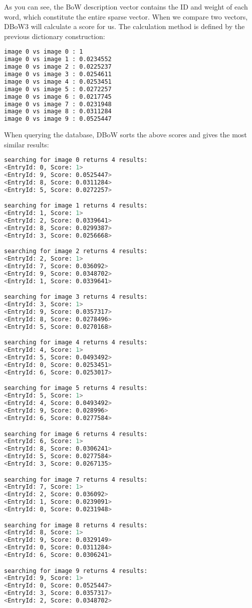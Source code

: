 As you can see, the BoW description vector contains the ID and weight of each word, which constitute the entire sparse vector. When we compare two vectors, DBoW3 will calculate a score for us. The calculation method is defined by the previous dictionary construction:

\begin{lstlisting}[language=sh,caption=Terminal output:]
image 0 vs image 0 : 1
image 0 vs image 1 : 0.0234552
image 0 vs image 2 : 0.0225237
image 0 vs image 3 : 0.0254611
image 0 vs image 4 : 0.0253451
image 0 vs image 5 : 0.0272257
image 0 vs image 6 : 0.0217745
image 0 vs image 7 : 0.0231948
image 0 vs image 8 : 0.0311284
image 0 vs image 9 : 0.0525447
\end{lstlisting}

When querying the database, DBoW sorts the above scores and gives the most similar results:
\begin{lstlisting}[language=sh,caption=Terminal output:]
searching for image 0 returns 4 results:
<EntryId: 0, Score: 1>
<EntryId: 9, Score: 0.0525447>
<EntryId: 8, Score: 0.0311284>
<EntryId: 5, Score: 0.0272257>

searching for image 1 returns 4 results:
<EntryId: 1, Score: 1>
<EntryId: 2, Score: 0.0339641>
<EntryId: 8, Score: 0.0299387>
<EntryId: 3, Score: 0.0256668>

searching for image 2 returns 4 results:
<EntryId: 2, Score: 1>
<EntryId: 7, Score: 0.036092>
<EntryId: 9, Score: 0.0348702>
<EntryId: 1, Score: 0.0339641>

searching for image 3 returns 4 results:
<EntryId: 3, Score: 1>
<EntryId: 9, Score: 0.0357317>
<EntryId: 8, Score: 0.0278496>
<EntryId: 5, Score: 0.0270168>

searching for image 4 returns 4 results:
<EntryId: 4, Score: 1>
<EntryId: 5, Score: 0.0493492>
<EntryId: 0, Score: 0.0253451>
<EntryId: 6, Score: 0.0253017>

searching for image 5 returns 4 results:
<EntryId: 5, Score: 1>
<EntryId: 4, Score: 0.0493492>
<EntryId: 9, Score: 0.028996>
<EntryId: 6, Score: 0.0277584>

searching for image 6 returns 4 results:
<EntryId: 6, Score: 1>
<EntryId: 8, Score: 0.0306241>
<EntryId: 5, Score: 0.0277584>
<EntryId: 3, Score: 0.0267135>

searching for image 7 returns 4 results:
<EntryId: 7, Score: 1>
<EntryId: 2, Score: 0.036092>
<EntryId: 1, Score: 0.0239091>
<EntryId: 0, Score: 0.0231948>

searching for image 8 returns 4 results:
<EntryId: 8, Score: 1>
<EntryId: 9, Score: 0.0329149>
<EntryId: 0, Score: 0.0311284>
<EntryId: 6, Score: 0.0306241>

searching for image 9 returns 4 results:
<EntryId: 9, Score: 1>
<EntryId: 0, Score: 0.0525447>
<EntryId: 3, Score: 0.0357317>
<EntryId: 2, Score: 0.0348702>
\end{lstlisting}

